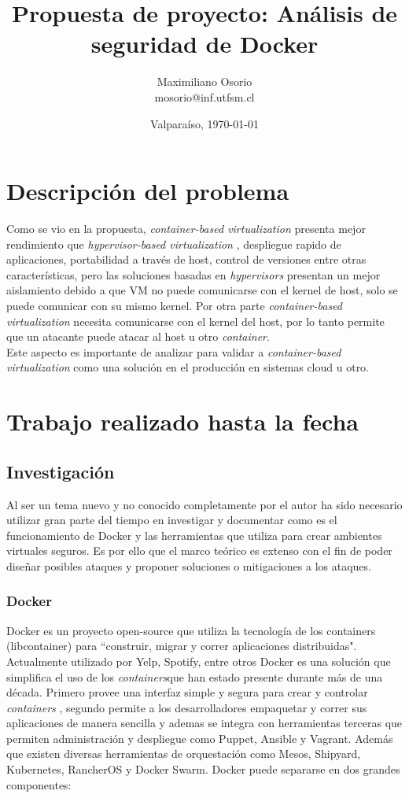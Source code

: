 \documentclass[letter,10pt]{article}
\title{Propuesta de proyecto: Análisis de seguridad de Docker  }
\author{Maximiliano Osorio \\ mosorio@inf.utfsm.cl}
\date{Valparaíso, \today}
\begin{document}
\maketitle

\newcommand{\container}{\textit{container}}
\newcommand{\containers}{\textit{containers}}

\section{Descripción del problema}
Como se vio en la propuesta, \textit{container-based virtualization} presenta mejor rendimiento que \textit{hypervisor-based virtualization} \cite{padala2007performance}, despliegue rapido de aplicaciones, portabilidad a través de host, control de versiones entre otras características\cite{Redhat:2015:Online}, pero las soluciones basadas en \textit{hypervisors} presentan un mejor aislamiento debido a que VM no puede comunicarse con el kernel de host, solo se puede comunicar con su mismo kernel. Por otra parte  \textit{container-based virtualization} necesita comunicarse con el kernel del host, por lo tanto permite que un atacante puede atacar al host u otro \container.\\ Este aspecto es importante de analizar para validar a \textit{container-based virtualization} como una solución en el producción en sistemas cloud u otro. 


\section{Trabajo realizado hasta la fecha}
\subsection{Investigación}
Al ser un tema nuevo y no conocido completamente por el autor ha sido necesario utilizar gran parte del tiempo en investigar y documentar como es el funcionamiento de Docker y las herramientas que utiliza para crear ambientes virtuales seguros. Es por ello que el marco teórico es extenso con el fin de poder diseñar posibles ataques y proponer soluciones o mitigaciones  a los ataques.
\subsubsection{Docker}
Docker es un proyecto open-source que utiliza la tecnología de los containers (libcontainer) para ``construir, migrar y correr aplicaciones distribuidas". Actualmente utilizado por Yelp, Spotify, entre otros \cite{Docker:2015:Online} \cite{marmolnetworking}
Docker es una solución que simplifica el uso de los \containers que han estado presente durante más de una década. Primero provee una interfaz simple y segura para crear y controlar \textit{containers} \cite{bui2015analysis}, segundo permite a los desarrolladores empaquetar y correr sus aplicaciones de manera sencilla y ademas se integra con herramientas terceras que permiten administración y despliegue como Puppet, Ansible y Vagrant. Además que existen diversas herramientas de orquestación como Mesos, Shipyard, Kubernetes, RancherOS y Docker Swarm. %
  Docker puede separarse en dos grandes componentes: 
  
\end{document}
